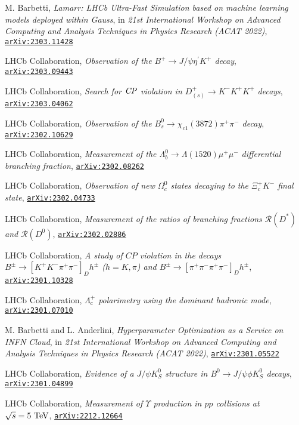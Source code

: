 \documentclass[a4paper, 11pt]{article}
\newenvironment{cvcontent}{
  \leftskip=0.5cm\rightskip=0cm
  \noindent\ignorespaces}{\par}
\newcommand{\arxiv}[1]{\href{https://arxiv.org/abs/#1}{\texttt{arXiv:#1}}}
\begin{document}
\begin{cvcontent}
\begin{enumerate}[label={[\arabic*]}, leftmargin=1.5cm]
    \item M. Barbetti,
    \emph{Lamarr: LHCb Ultra-Fast Simulation based on machine learning models deployed within Gauss},
    in \emph{21st International Workshop on Advanced Computing and Analysis Techniques in Physics Research (ACAT 2022)},
    \arxiv{2303.11428}
    \item LHCb Collaboration,
    \emph{Observation of the $B^+ \rightarrow J/\psi \eta^{\prime} K^+$ decay},
    \arxiv{2303.09443}
    \item LHCb Collaboration,
    \emph{Search for $\it{CP}$ violation in $D_{(s)}^{+}\rightarrow K^{-}K^{+}K^{+}$ decays},
    \arxiv{2303.04062}
    \item LHCb Collaboration,
    \emph{Observation of the $B^0_s\rightarrow \chi_{c1}(3872)\pi^+\pi^-$ decay},
    \arxiv{2302.10629}
    \item LHCb Collaboration,
    \emph{Measurement of the $\Lambda_{b}^{0}\to \Lambda(1520) \mu^{+}\mu^{-}$ differential branching fraction},
    \arxiv{2302.08262}
    \sloppy
    \item LHCb Collaboration,
    \emph{Observation of new $\Omega_c^{0}$ states decaying to the $\Xi_c^+K^-$ final state},
    \arxiv{2302.04733}
    \item LHCb Collaboration,
    \emph{Measurement of the ratios of branching fractions $\mathcal{R}(D^{*})$ and $\mathcal{R}(D^{0})$},
    \arxiv{2302.02886}
    \item LHCb Collaboration,
    \emph{A study of $C\!P$ violation in the decays $B^\pm\to[K^+K^-\pi^+\pi^-]_D h^{\pm}$ ($h = K, \pi$) and $B^\pm\to[\pi^+\pi^-\pi^+\pi^-]_D h^{\pm}$},
    \arxiv{2301.10328}
    \item LHCb Collaboration,
    \emph{$\Lambda^+_\mathrm{c}$ polarimetry using the dominant hadronic mode},
    \arxiv{2301.07010}
    \item M. Barbetti and L. Anderlini,
    \emph{Hyperparameter Optimization as a Service on INFN Cloud},
    in \emph{21st International Workshop on Advanced Computing and Analysis Techniques in Physics Research (ACAT 2022)},
    \arxiv{2301.05522}
    \item LHCb Collaboration,
    \emph{Evidence of a $J/\psi K_S^0$ structure in $B^0 \to J/\psi \phi K_S^0$ decays},
    \arxiv{2301.04899}
    \sloppy
    \item LHCb Collaboration,
    \emph{Measurement of $\Upsilon$ production in $pp$ collisions at $\sqrt{s}=5~\rm{TeV}$},
    \arxiv{2212.12664}

\end{enumerate}
\end{cvcontent}
\end{document}
